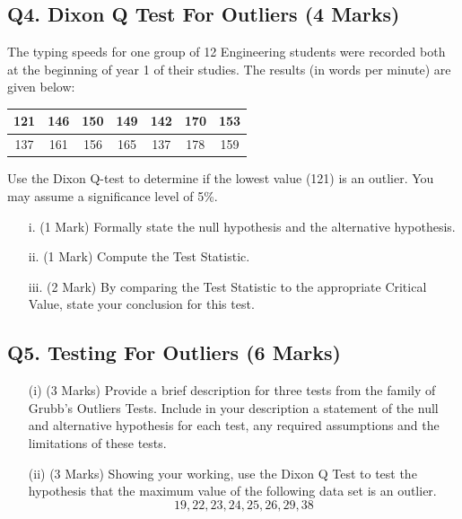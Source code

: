 \documentclass[a4paper,12pt]{article}
\begin{document}
\subsection*{Q4. Dixon Q Test For Outliers (4 Marks)}

The typing speeds for one group of 12 Engineering students were recorded both at the beginning of year 1 of their studies. The results (in words per minute) are given below:

\begin{center}
\begin{tabular}{|c|c|c|c|c|c|c|}
\hline
121 & 146 & 150 &149 &142 &170& 153\\ \hline
 137 & 161 & 156& 165& 137& 178& 159
\\ \hline
\end{tabular}
\end{center}
Use the Dixon Q-test to determine if the lowest value (121) is an outlier. You may assume a significance level of 5\%.

\begin{itemize}
\item[i.] (1 Mark) Formally state the null hypothesis and the alternative hypothesis.
\item[ii.] (1 Mark) Compute the Test Statistic.
\item[iii.] (2 Mark) By comparing the Test Statistic to the appropriate Critical Value, state your conclusion for this test.
\end{itemize}


\subsection*{Q5. Testing For Outliers (6 Marks)}
\begin{itemize}
	\item[(i)] (3 Marks) Provide a brief description for three tests from the family of Grubb's  Outliers Tests. Include in your description a statement of the null and alternative hypothesis for each test, any required assumptions and the limitations of these tests.
	\item[(ii)] (3 Marks) Showing your working, use the Dixon Q Test to test the hypothesis that the maximum value of the following data set is an outlier.
	\[ 19,22,23,24,25,26,29,38\]
\end{itemize}
\end{document}
